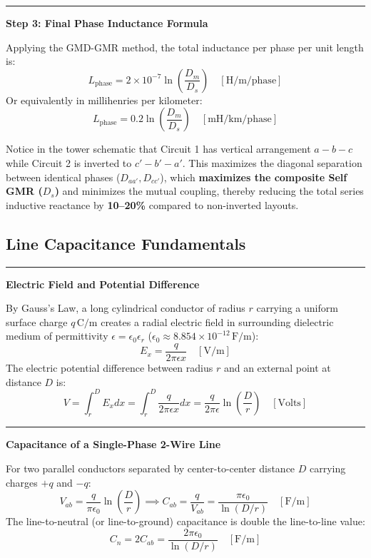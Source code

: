 \documentclass[11pt,a4paper]{article}
\newcommand{\concept}[1]{%
  \vspace{3pt}\noindent\textcolor{AnthGreen}{\rule{3.5pt}{10pt}}\enspace
  \textbf{\sffamily\color{AnthDark}#1}\par\vspace{2pt}%
}
\newenvironment{Tip}[1][Key Engineering Insight]{\begin{tcolorbox}[tipbox, title=#1]}{\end{tcolorbox}}
\newenvironment{Deriv}[1][Mathematical Derivation]{\begin{tcolorbox}[derivbox, title=#1]}{\end{tcolorbox}}
\begin{document}
\begin{Deriv}[Complete Step-by-Step Derivation of Inductance for 3-$\Phi$ Double Circuit]
\concept{Step 3: Final Phase Inductance Formula}
Applying the GMD-GMR method, the total inductance per phase per unit length is:
\begin{equation}
  L_{\text{phase}} = 2 \times 10^{-7} \ln\left( \frac{D_m}{D_s} \right) \quad [\text{H/m/phase}]
\end{equation}
Or equivalently in millihenries per kilometer:
\begin{equation}
  L_{\text{phase}} = 0.2 \ln\left( \frac{D_m}{D_s} \right) \quad [\text{mH/km/phase}]
\end{equation}
\end{Deriv}

\begin{Tip}[Why Inverted Phase Configuration ($a-b-c$ vs $c'-b'-a'$) is Preferred]
Notice in the tower schematic that Circuit 1 has vertical arrangement $a-b-c$ while Circuit 2 is inverted to $c'-b'-a'$. This maximizes the diagonal separation between identical phases ($D_{aa'}, D_{cc'}$), which \textbf{maximizes the composite Self GMR ($D_s$)} and minimizes the mutual coupling, thereby reducing the total series inductive reactance by \textbf{10--20\%} compared to non-inverted layouts.
\end{Tip}

\subsection{Line Capacitance Fundamentals}

\concept{Electric Field and Potential Difference}
By Gauss's Law, a long cylindrical conductor of radius $r$ carrying a uniform surface charge $q\,\text{C/m}$ creates a radial electric field in surrounding dielectric medium of permittivity $\epsilon = \epsilon_0 \epsilon_r$ ($\epsilon_0 \approx 8.854 \times 10^{-12}\,\text{F/m}$):
\begin{equation}
  E_x = \frac{q}{2\pi \epsilon x} \quad [\text{V/m}]
\end{equation}
The electric potential difference between radius $r$ and an external point at distance $D$ is:
\begin{equation}
  V = \int_{r}^{D} E_x dx = \int_{r}^{D} \frac{q}{2\pi \epsilon x} dx = \frac{q}{2\pi \epsilon} \ln\left(\frac{D}{r}\right) \quad [\text{Volts}]
\end{equation}

\concept{Capacitance of a Single-Phase 2-Wire Line}
For two parallel conductors separated by center-to-center distance $D$ carrying charges $+q$ and $-q$:
\begin{equation}
  V_{ab} = \frac{q}{\pi \epsilon_0} \ln\left(\frac{D}{r}\right) \implies C_{ab} = \frac{q}{V_{ab}} = \frac{\pi \epsilon_0}{\ln(D/r)} \quad [\text{F/m}]
\end{equation}
The line-to-neutral (or line-to-ground) capacitance is double the line-to-line value:
\begin{equation}
  C_n = 2 C_{ab} = \frac{2\pi \epsilon_0}{\ln(D/r)} \quad [\text{F/m}]
\end{equation}
\end{document}
